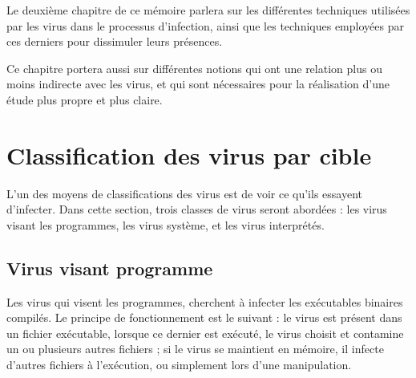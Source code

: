 
Le deuxième chapitre de ce mémoire parlera sur les différentes techniques utilisées par les virus 
dans le processus d'infection, ainsi que les techniques employées par ces derniers pour dissimuler leurs présences.

Ce chapitre portera aussi sur différentes notions qui ont une relation plus ou moins indirecte avec les virus,
et qui sont nécessaires pour la réalisation d'une étude plus propre et plus claire. %

\newpage


\section{Classification des virus par cible}
L'un des moyens de classifications des virus est de voir ce qu'ils essayent d'infecter.
Dans cette section, trois classes de virus seront abordées : les virus visant les programmes, les virus système,
et les virus interprétés. %

    \subsection{Virus visant programme}
    Les virus qui visent les programmes, cherchent à infecter les exécutables binaires compilés. 
    Le principe de fonctionnement est le suivant : le virus est présent dans un fichier exécutable, lorsque 
    ce dernier est exécuté, le virus choisit et contamine un ou plusieurs autres fichiers ; si le virus se maintient
    en mémoire, il infecte d'autres fichiers à l'exécution, ou simplement lors d'une manipulation. 
    \cite{virus_informatique_article}%

